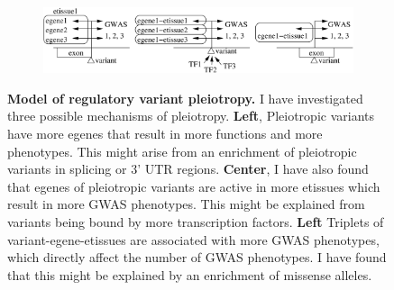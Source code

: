 \begin{figure}[!]
\centering
%
\begin{subfigure}[]{\textwidth}

\includegraphics[width=\textwidth]{fig/graphical_summary.png}
\end{subfigure}

\caption{\textbf{Model of regulatory variant pleiotropy.} I have investigated three possible mechanisms of pleiotropy. \textbf{Left}, Pleiotropic variants have more egenes that result in more functions and more phenotypes. This might arise from an enrichment of pleiotropic variants in splicing or 3' UTR regions. \textbf{Center}, I have also found that egenes of pleiotropic variants are active in more etissues which result in more GWAS phenotypes. This might be explained from variants being bound by more transcription factors. \textbf{Left} Triplets of variant-egene-etissues are associated with more GWAS phenotypes, which directly affect the number of GWAS phenotypes. I have found that this might be explained by an enrichment of missense alleles.} \label{fig:beta}
%
\end{figure}

